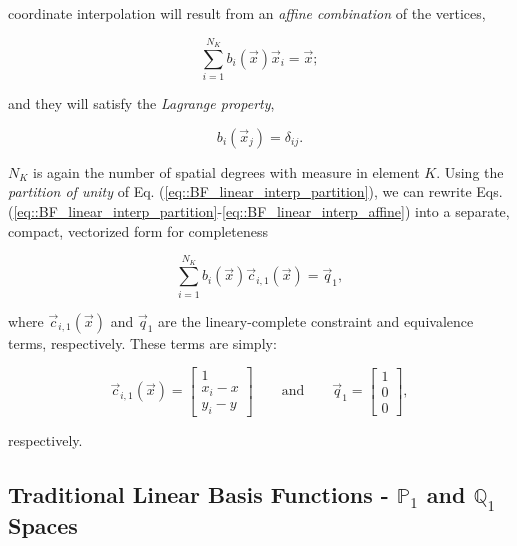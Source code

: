 \noindent coordinate interpolation will result from an {\em affine combination} of the vertices,

\begin{equation}
\sum_{i=1}^{N_K} b_i(\vec{x}) \vec{x}_i  =  \vec{x};
\label{eq::BF_linear_interp_affine}
\end{equation}

\noindent and they will satisfy the {\em Lagrange property},

\begin{equation}
b_i (\vec{x}_j) = \delta_{ij}.
\label{eq::BF_linear_interp_lagrange}
\end{equation}

\noindent $N_K$ is again the number of spatial degrees with measure in element $K$. Using the {\em partition of unity} of Eq. (\ref{eq::BF_linear_interp_partition}), we can rewrite Eqs. (\ref{eq::BF_linear_interp_partition}-\ref{eq::BF_linear_interp_affine}) into a separate, compact, vectorized form for completeness

\begin{equation}
\sum_{i=1}^{N_K}  b_i (\vec{x}) \vec{c}_{i,1}(\vec{x}) = \vec{q}_1 ,
\label{eq::BF_linear_interp_req_vector}
\end{equation}

\noindent where $\vec{c}_{i,1}(\vec{x})$ and $\vec{q}_1$ are the lineary-complete constraint and equivalence terms, respectively. These terms are simply:

\begin{equation}
\vec{c}_{i,1}(\vec{x}) = \left[
\begin{array}{c}
1 \\
x_i - x \\
y_i - y
\end{array} \right]
  \qquad \text{and} \qquad \vec{q}_1 = \left[
\begin{array}{c}
1 \\
0 \\
0
\end{array} \right],
\label{eq::BF_linear_constraint_terms}
\end{equation}

\noindent respectively.

\subsection{Traditional Linear Basis Functions - $\mathbb{P}_{1}$ and $\mathbb{Q}_{1}$ Spaces}
\label{sec::BF_2DLinear_LDandBLD}

